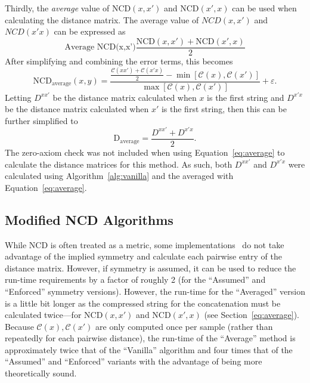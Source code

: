 \documentclass[preprint,12pt]{elsarticle}
\begin{document}
Thirdly, the \textit{average} value of $\text{NCD}(x,x')$ and $\text{NCD}(x',x)$ can be used when calculating the distance matrix. 
The average value of $NCD(x,x')$ and $NCD(x'x)$ can be expressed as
$$
\text{Average~NCD(x,x')}\frac{\text{NCD}(x,x') + \text{NCD}(x', x)}{2}
$$
After simplifying and combining the error terms, this becomes
\begin{equation}
    \text{NCD}_{\text{average}}(x, y) = \frac{\frac{\mathcal{C}(xx') + \mathcal{C}(x'x)}{2} - \min[\mathcal{C}(x), \mathcal{C}(x')]}{\max[\mathcal{C}(x), \mathcal{C}(x')]} + \varepsilon.
\end{equation}
Letting $D^{xx'}$ be the distance matrix calculated when $x$ is the first string and $D^{x'x}$ be the distance matrix calculated when $x'$ is the first string, then this can be further simplified to
\begin{equation}
    \text{D}_{\text{average}} = \frac{D^{xx'}  + D^{x'x}}{2}.
    \label{eq:average}
\end{equation}
The zero-axiom check was not included when using Equation~\ref{eq:average} to calculate the distance matrices for this method. 
As such, both $D^{xx'}$ and $D^{x'x}$ were calculated using Algorithm~\ref{alg:vanilla} and the averaged with Equation~\ref{eq:average}.

\subsection{Modified NCD Algorithms}

While NCD is often treated as a metric, some implementations~\cite{jiang2022less} do not take advantage of the implied symmetry and calculate each pairwise entry of the distance matrix.
However, if symmetry is assumed, it can be used to reduce the run-time requirements by a factor of roughly 2 (for the ``Assumed'' and ``Enforced'' symmetry versions). 
However, the run-time for the ``Averaged'' version is a little bit longer as the compressed string for the concatenation must be calculated twice---for $\text{NCD}(x,x')$ and $\text{NCD}(x',x)$ (see Section~\ref{eq:average}).
Because $\mathcal{C}(x), \mathcal{C}(x')$ are only computed once per sample (rather than repeatedly for each pairwise distance), the run-time of the ``Average'' method is approximately twice that of the ``Vanilla'' algorithm and four times that of the ``Assumed'' and ``Enforced'' variants with the advantage of being more theoretically sound.
\end{document}
